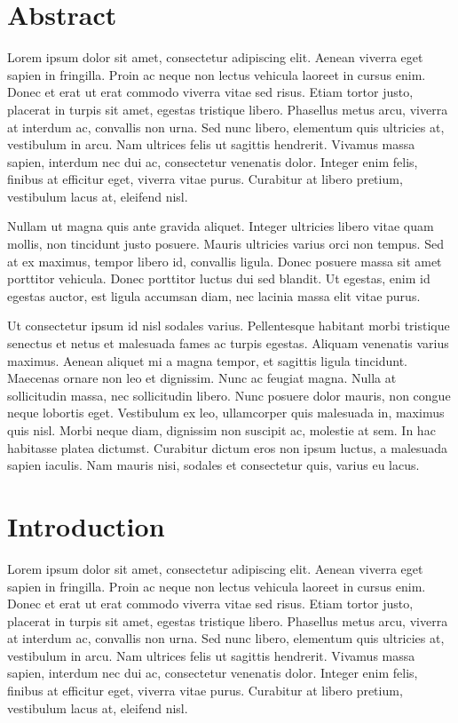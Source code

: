 \chapter*{Abstract}

Lorem ipsum dolor sit amet, consectetur adipiscing elit. Aenean viverra eget sapien in fringilla. Proin ac neque non lectus vehicula laoreet in cursus enim. Donec et erat ut erat commodo viverra vitae sed risus. Etiam tortor justo, placerat in turpis sit amet, egestas tristique libero. Phasellus metus arcu, viverra at interdum ac, convallis non urna. Sed nunc libero, elementum quis ultricies at, vestibulum in arcu. Nam ultrices felis ut sagittis hendrerit. Vivamus massa sapien, interdum nec dui ac, consectetur venenatis dolor. Integer enim felis, finibus at efficitur eget, viverra vitae purus. Curabitur at libero pretium, vestibulum lacus at, eleifend nisl.

Nullam ut magna quis ante gravida aliquet. Integer ultricies libero vitae quam mollis, non tincidunt justo posuere. Mauris ultricies varius orci non tempus. Sed at ex maximus, tempor libero id, convallis ligula. Donec posuere massa sit amet porttitor vehicula. Donec porttitor luctus dui sed blandit. Ut egestas, enim id egestas auctor, est ligula accumsan diam, nec lacinia massa elit vitae purus.

Ut consectetur ipsum id nisl sodales varius. Pellentesque habitant morbi tristique senectus et netus et malesuada fames ac turpis egestas. Aliquam venenatis varius maximus. Aenean aliquet mi a magna tempor, et sagittis ligula tincidunt. Maecenas ornare non leo et dignissim. Nunc ac feugiat magna. Nulla at sollicitudin massa, nec sollicitudin libero. Nunc posuere dolor mauris, non congue neque lobortis eget. Vestibulum ex leo, ullamcorper quis malesuada in, maximus quis nisl. Morbi neque diam, dignissim non suscipit ac, molestie at sem. In hac habitasse platea dictumst. Curabitur dictum eros non ipsum luctus, a malesuada sapien iaculis. Nam mauris nisi, sodales et consectetur quis, varius eu lacus.

\chapter*{Introduction}

Lorem ipsum dolor sit amet, consectetur adipiscing elit. Aenean viverra eget sapien in fringilla. Proin ac neque non lectus vehicula laoreet in cursus enim. Donec et erat ut erat commodo viverra vitae sed risus. Etiam tortor justo, placerat in turpis sit amet, egestas tristique libero. Phasellus metus arcu, viverra at interdum ac, convallis non urna. Sed nunc libero, elementum quis ultricies at, vestibulum in arcu. Nam ultrices felis ut sagittis hendrerit. Vivamus massa sapien, interdum nec dui ac, consectetur venenatis dolor. Integer enim felis, finibus at efficitur eget, viverra vitae purus. Curabitur at libero pretium, vestibulum lacus at, eleifend nisl.

